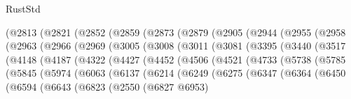 \begin{lexlean}{RustStd}
\begin{coremodule}
{\begin{coremodule}
{{{{{{{{{{{{{{{{{{{{{{{{{{{{{{{{      (@2813
        (@2821
          (@2852
            (@2859
              (@2873
                (@2879
                  (@2905
                    (@2944
                      (@2955
                        (@2958
                          (@2963
                            (@2966
                              (@2969
                                (@3005
                                  (@3008
                                    (@3011
                                      (@3081
                                        (@3395
                                          (@3440
                                            (@3517
                                              (@4148
                                                (@4187
                                                  (@4322
                                                    (@4427
                                                      (@4452
                                                        (@4506
                                                          (@4521
                                                            (@4733
                                                              (@5738
                                                                (@5785
                                                                  (@5845
                                                                    (@5974
                                                                      (@6063
                                                                        (@6137
                                                                          (@6214
                                                                            (@6249
                                                                              (@6275
                                                                                (@6347
                                                                                  (@6364
                                                                                    (@6450
                                                                                      (@6594
                                                                                        (@6643
                                                                                          (@6823
                                                                                            (@2550
                                                                                              (@6827
                                                                                                @6953)
}}}}}}}}}}}}}}}}}}}}}}}}}}}}}}}}
\end{coremodule}}
\end{coremodule}
\end{lexlean}
